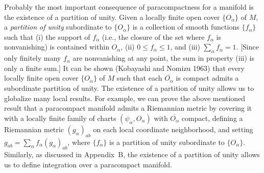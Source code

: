 Probably the most important consequence of paracompactness for a manifold is the
existence of a partition of unity. Given a locally finite open cover \(\{O_\alpha\}\)
of \(M\), a \emph{partition of unity} subordinate to \(\{O_\alpha\}\) is a collection
of smooth functions \(\{f_\alpha\}\) such that (i) the support of \(f_\alpha\) (i.e.,
the closure of the set where \(f_\alpha\) is nonvanishing) is contained within
\(O_\alpha\), (ii) \(0\leq f_\alpha\leq1\), and (iii) \(\sum_\alpha f_\alpha=1\).
[Since only finitely many \(f_\alpha\) are nonvanishing at any point, the sum in
property (iii) is only a finite sum.] It can be shown (Kobayashi and Nomizu 1963)
that every locally finite open cover \(\{O_\alpha\}\) of \(M\) such that each
\(\overline{O_\alpha}\) is compact admits a subordinate partition of unity. The
existence of a partition of unity allows us to globalize many local results. For
example, we can prove the above mentioned result that a paracompact manifold admits
a Riemannian metric by covering it with a locally finite family of charts
\((\psi_\alpha,O_\alpha)\) with \(\overline{O_\alpha}\) compact, defining a Riemannian
metric \((g_\alpha)_{ab}\) on each local coordinate neighborhood, and setting
\(g_{ab}=\sum_\alpha f_\alpha(g_\alpha)_{ab}\), where \(\{f_\alpha\}\) is a partition
of unity subordinate to \(\{O_\alpha\}\). Similarly, as discussed in Appendix~B, the
existence of a partition of unity allows us to define integration over a paracompact
manifold.
